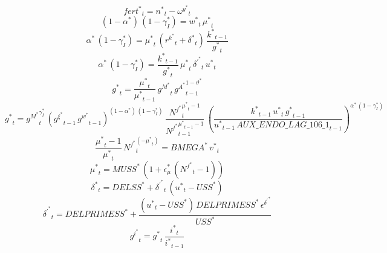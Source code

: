 \begin{dmath}
{{fert^*}}_{t}={{n^*}}_{t}-{{\omega^y^*}}_{t}
\end{dmath}
\begin{dmath}
\left(1-{{\alpha^*}}\right)\, \left(1-{{\gamma_I^*}}\right)={{w^*}}_{t}\, {{\mu^*}}_{t}
\end{dmath}
\begin{dmath}
{{\alpha^*}}\, \left(1-{{\gamma_I^*}}\right)={{\mu^*}}_{t}\, \left({{r^k^*}}_{t}+{{\delta^*}}_{t}\right)\, \frac{{{k^*}}_{t-1}}{{{g^*}}_{t}}
\end{dmath}
\begin{dmath}
{{\alpha^*}}\, \left(1-{{\gamma_I^*}}\right)=\frac{{{k^*}}_{t-1}}{{{g^*}}_{t}}\, {{\mu^*}}_{t}\, {{\delta^\prime^*}}_{t}\, {{u^*}}_{t}
\end{dmath}
\begin{dmath}
{{g^*}}_{t}=\frac{{{\mu^*}}_{t}}{{{\mu^*}}_{t-1}}\, {{g^M^*}}_{t}\, {{g^A^*}}_{t-1}^{1-{{\vartheta^*}}}
\end{dmath}
\begin{dmath}
{{g^*}}_{t}={{g^M^*}}_{t}^{{{\gamma_I^*}}}\, \left({{g^{\xi}^*}}_{t-1}\, {{g^w^*}}_{t-1}\right)^{\left(1-{{\alpha^*}}\right)\, \left(1-{{\gamma_I^*}}\right)}\, \frac{{{N^f^*}}_{t}^{{{\mu^*}}_{t}-1}}{{{N^f^*}}_{t-1}^{{{\mu^*}}_{t-1}-1}}\, \left(\frac{{{k^*}}_{t-1}\, {{u^*}}_{t}\, {{g^*}}_{t-1}}{{{u^*}}_{t-1}\, {AUX\_ENDO\_LAG\_106\_1}_{t-1}}\right)^{{{\alpha^*}}\, \left(1-{{\gamma_I^*}}\right)}
\end{dmath}
\begin{dmath}
\frac{{{\mu^*}}_{t}-1}{{{\mu^*}}_{t}}\, {{N^f^*}}_{t}^{\left(-{{\mu^*}}_{t}\right)}={{BMEGA^*}}\, {{v^*}}_{t}
\end{dmath}
\begin{dmath}
{{\mu^*}}_{t}={{MUSS^*}}\, \left(1+{{\epsilon_{\mu}^*}}\, \left({{N^f^*}}_{t}-1\right)\right)
\end{dmath}
\begin{dmath}
{{\delta^*}}_{t}={{DELSS^*}}+{{\delta^\prime^*}}_{t}\, \left({{u^*}}_{t}-{{USS^*}}\right)
\end{dmath}
\begin{dmath}
{{\delta^\prime^*}}_{t}={{DELPRIMESS^*}}+\frac{\left({{u^*}}_{t}-{{USS^*}}\right)\, {{DELPRIMESS^*}}\, {{\epsilon^{\delta^{\prime}}^*}}}{{{USS^*}}}
\end{dmath}
\begin{dmath}
{{g^i^*}}_{t}={{g^*}}_{t}\, \frac{{{i^*}}_{t}}{{{i^*}}_{t-1}}
\end{dmath}
